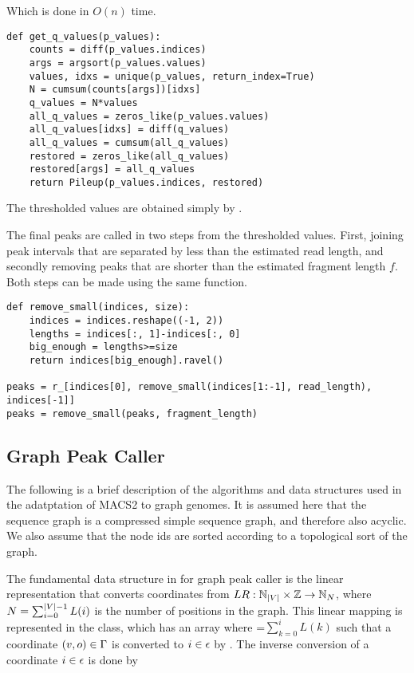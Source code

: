 Which is done in $O(n)$ time.
\begin{lstlisting}
def get_q_values(p_values):
    counts = diff(p_values.indices)
    args = argsort(p_values.values)
    values, idxs = unique(p_values, return_index=True)
    N = cumsum(counts[args])[idxs]
    q_values = N*values
    all_q_values = zeros_like(p_values.values)
    all_q_values[idxs] = diff(q_values)
    all_q_values = cumsum(all_q_values)
    restored = zeros_like(all_q_values)
    restored[args] = all_q_values
    return Pileup(p_values.indices, restored)
  \end{lstlisting}
  The thresholded values are obtained simply by .

The final peaks are called in two steps from the thresholded values. First, joining peak intervals that are separated by less than the estimated read length, and secondly removing peaks that are shorter than the estimated fragment length $f$. Both steps can be made using the same function.
\begin{lstlisting}
def remove_small(indices, size):
    indices = indices.reshape((-1, 2))
    lengths = indices[:, 1]-indices[:, 0]
    big_enough = lengths>=size
    return indices[big_enough].ravel()

peaks = r_[indices[0], remove_small(indices[1:-1], read_length), indices[-1]]
peaks = remove_small(peaks, fragment_length)
\end{lstlisting}
\subsection{Graph Peak Caller}
The following is a brief description of the algorithms and data structures used in the adatptation of MACS2 to graph genomes. 
It is assumed here that the sequence graph is a compressed simple sequence graph, and therefore also acyclic. We also assume that the node ids are sorted according to a topological sort of the graph.

The fundamental data structure in for graph peak caller is the linear representation that converts coordinates from $LR: \mathbb{N}_{\left|V\right|} \times \mathbb{Z} \rightarrow \mathbb{N}_{N}$, where $N=\sum_{i=0}^{\left|V\right|-1}L(i)$ is the number of positions in the graph.
This linear mapping is represented in the  class, which has an array  where =$\sum_{k=0}^i L(k)$ such that a coordinate $(v, o) \in \Gamma$ is converted to $i \in \epsilon$ by . The inverse conversion of a coordinate $i \in \epsilon$ is done by 

